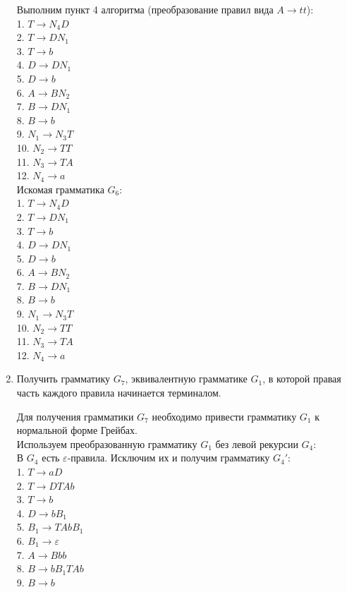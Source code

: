 \documentclass[a4paper,14pt]{extarticle}
\begin{document}
\begin{enumerate}[1.]
Выполним пункт 4 алгоритма (преобразование правил вида $A \rightarrow tt$):\\
1. $T \rightarrow N_4D$\\
2. $T \rightarrow DN_1$\\
3. $T \rightarrow b$\\
4. $D \rightarrow DN_1$\\
5. $D \rightarrow b$\\
6. $A \rightarrow BN_2$\\
7. $B \rightarrow DN_1$\\
8. $B \rightarrow b$\\
9. $N_1 \rightarrow N_3T$\\
10. $N_2 \rightarrow TT$\\
11. $N_3 \rightarrow TA$\\
12. $N_4 \rightarrow a$\\

Искомая грамматика $G_6$:\\
1. $T \rightarrow N_4D$\\
2. $T \rightarrow DN_1$\\
3. $T \rightarrow b$\\
4. $D \rightarrow DN_1$\\
5. $D \rightarrow b$\\
6. $A \rightarrow BN_2$\\
7. $B \rightarrow DN_1$\\
8. $B \rightarrow b$\\
9. $N_1 \rightarrow N_3T$\\
10. $N_2 \rightarrow TT$\\
11. $N_3 \rightarrow TA$\\
12. $N_4 \rightarrow a$\\

\item Получить грамматику $G_7$, эквивалентную грамматике $G_1$, в которой 
правая часть каждого правила начинается терминалом.

Для получения грамматики $G_7$ 
необходимо привести грамматику $G_1$ 
к нормальной форме Грейбах.\\

Используем преобразованную грамматику $G_1$ без левой рекурсии $G_4$:\\

В $G_4$ есть $\varepsilon$-правила. Исключим их и получим грамматику $G_4'$:\\
1. $T \rightarrow aD$\\
2. $T \rightarrow DTAb$\\
3. $T \rightarrow b$\\
4. $D \rightarrow bB_1$\\
5. $B_1 \rightarrow TAbB_1$\\
6. $B_1 \rightarrow \varepsilon$\\
7. $A \rightarrow Bbb$\\
8. $B \rightarrow bB_1TAb$\\
9. $B \rightarrow b$\\


\end{enumerate}
\end{document}
